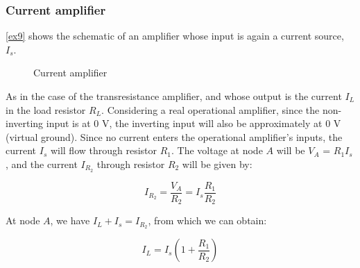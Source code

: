\documentclass[../main.tex]{subfiles}
\begin{document}
\subsubsection{Current amplifier}	


\autoref{ex9} shows the schematic of an amplifier whose input is again a current source, $I_s$. 


\begin{figure}[h!]
\begin{center}



\caption{Current amplifier}	
\label{ex9}
\end{center}	
\end{figure}


As in the case of the transresistance amplifier, and whose output is the current $I_L$ in the load resistor $R_L$. 
Considering a real operational amplifier, since the non-inverting input is at 0 V, the inverting input will also be approximately at 0 V (virtual ground). Since no current enters the operational amplifier’s inputs, the current $I_s$ will flow through resistor $R_1$. The voltage at node $A$ will be $V_A$ = $R_1I_s$, and the current $I_{R_2}$ through resistor $R_2$ will be given by:

\begin{equation}
	I_{R_2} = \frac{V_A}{R_2} = I_s \frac{R_1}{R_2}
\end{equation}

At node $A$, we have $I_L + I_s = I_{R_2}$, from which we can obtain:

\begin{equation}
	I_L = I_s \left( 1 + \frac{R_1}{R_2} \right)
\end{equation}
\end{document}
